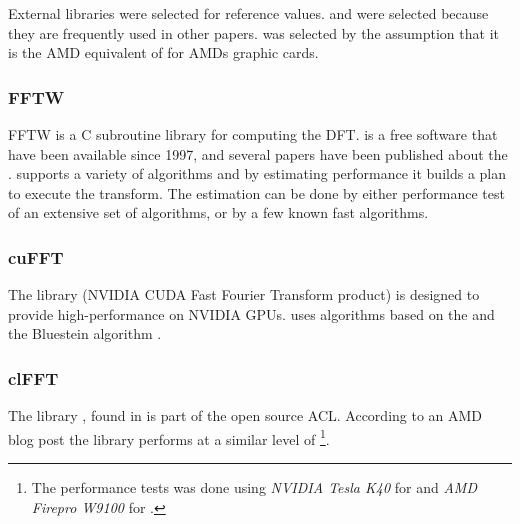 External libraries were selected for reference values. {\FFTW} and {\CUFFT} were selected because they are frequently used in other papers. {\CLFFT} was selected by the assumption that it is the AMD equivalent of {\CUFFT} for AMDs graphic cards.

\subsubsection{FFTW}

\gls{FFTW} is a C subroutine library for computing the \gls{DFT}. {\FFTW} is a free software\cite{fftw2015} that have been available since 1997, and several papers have been published about the {\FFTW} \cite{frigo1999fast,frigo1998fftw,frigo2005design}. {\FFTW} supports a variety of algorithms and by estimating performance it builds a plan to execute the transform. The estimation can be done by either performance test of an extensive set of algorithms, or by a few known fast algorithms.

\subsubsection{cuFFT}

The library {\CUFFT} (NVIDIA CUDA Fast Fourier Transform product) \cite{nvidia2013userguide} is designed to provide high-performance on NVIDIA \gls{GPU}s. {\CUFFT} uses algorithms based on the {\CTALG} and the Bluestein algorithm \cite{bluestein1970linear}.

\subsubsection{clFFT}

The library {\CLFFT}, found in \cite{githubclfft} is part of the open source \gls{ACL}\cite{amdacl}. According to an AMD blog post\cite{amd2015performance} the library performs at a similar level of {\CUFFT}\footnote{The performance tests was done using \emph{NVIDIA Tesla K40} for {\CUFFT} and \emph{AMD Firepro W9100} for {\CLFFT}.}.
